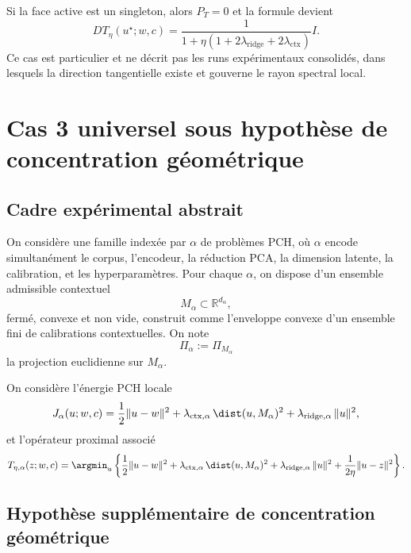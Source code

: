 Si la face active est un singleton, alors $P_T=0$ et la formule devient
\[
DT_\eta(u^\star;w,c)
=
\frac1{1+\eta(1+2\lambda_{\mathrm{ridge}}+2\lambda_{\mathrm{ctx}})}I.
\]
Ce cas est particulier et ne décrit pas les runs expérimentaux consolidés, dans lesquels la direction tangentielle existe et gouverne le rayon spectral local.









\section{Cas 3 universel sous hypothèse de concentration géométrique}

\subsection{Cadre expérimental abstrait}

On considère une famille indexée par $\alpha$ de problèmes PCH, où $\alpha$ encode simultanément le corpus, l'encodeur, la réduction PCA, la dimension latente, la calibration, et les hyperparamètres.
Pour chaque $\alpha$, on dispose d'un ensemble admissible contextuel
\[
M_\alpha \subset \mathbb R^{d_\alpha},
\]
fermé, convexe et non vide, construit comme l'enveloppe convexe d'un ensemble fini de calibrations contextuelles.
On note
\[
\Pi_\alpha := \Pi_{M_\alpha}
\]
la projection euclidienne sur $M_\alpha$.

On considère l'énergie PCH locale
\[
J_\alpha(u;w,c)
=
\frac12\|u-w\|^2
+
\lambda_{\mathrm{ctx},\alpha}\,\dist(u,M_\alpha)^2
+
\lambda_{\mathrm{ridge},\alpha}\,\|u\|^2,
\]
et l'opérateur proximal associé
\[
T_{\eta,\alpha}(z;w,c)
=
\argmin_u
\left\{
\frac12\|u-w\|^2
+
\lambda_{\mathrm{ctx},\alpha}\,\dist(u,M_\alpha)^2
+
\lambda_{\mathrm{ridge},\alpha}\,\|u\|^2
+
\frac{1}{2\eta}\|u-z\|^2
\right\}.
\]

\subsection{Hypothèse supplémentaire de concentration géométrique}

